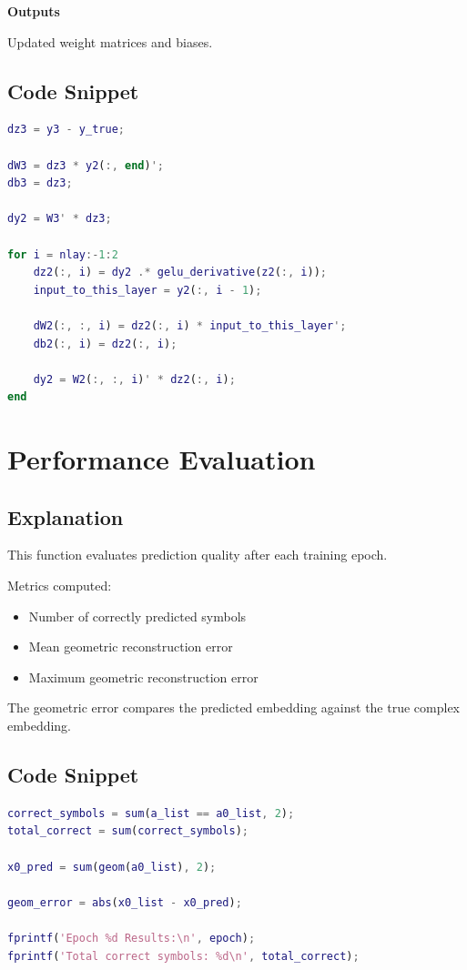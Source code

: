 \textbf{Outputs}

Updated weight matrices and biases.

\subsection{Code Snippet}

\begin{lstlisting}[language=Matlab]
dz3 = y3 - y_true;

dW3 = dz3 * y2(:, end)';
db3 = dz3;

dy2 = W3' * dz3;

for i = nlay:-1:2
    dz2(:, i) = dy2 .* gelu_derivative(z2(:, i));
    input_to_this_layer = y2(:, i - 1);

    dW2(:, :, i) = dz2(:, i) * input_to_this_layer';
    db2(:, i) = dz2(:, i);

    dy2 = W2(:, :, i)' * dz2(:, i);
end
\end{lstlisting}

\newpage

\section{Performance Evaluation}

\subsection{Explanation}

This function evaluates prediction quality after each training epoch.

Metrics computed:

\begin{itemize}
\item Number of correctly predicted symbols
\item Mean geometric reconstruction error
\item Maximum geometric reconstruction error
\end{itemize}

The geometric error compares the predicted embedding against the true complex embedding.

\subsection{Code Snippet}

\begin{lstlisting}[language=Matlab]
correct_symbols = sum(a_list == a0_list, 2);
total_correct = sum(correct_symbols);

x0_pred = sum(geom(a0_list), 2);

geom_error = abs(x0_list - x0_pred);

fprintf('Epoch %d Results:\n', epoch);
fprintf('Total correct symbols: %d\n', total_correct);
\end{lstlisting}

